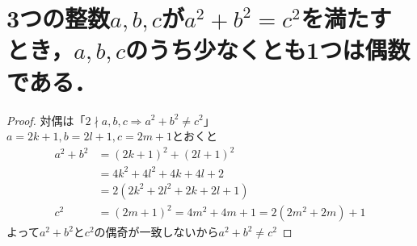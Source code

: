 \documentclass[a4paper,12pt]{ltjsarticle}
\begin{document}
\section{3つの整数$a, b, c$が$a^2 + b^2 = c^2$を満たすとき，$a, b, c$のうち少なくとも1つは偶数である．}
\begin{proof}
    対偶は「$2 \nmid a,b,c \Rightarrow a^2 + b^2 \neq c^2$」 \\
    $a = 2k + 1, b = 2l + 1, c = 2m + 1$とおくと
    \begin{align*}
        a^2 + b^2 &= (2k + 1)^2 + (2l + 1)^2 \\
                  &= 4k^2 + 4l^2 + 4k + 4l + 2 \\
                  &= 2(2k^2 + 2l^2 + 2k + 2l + 1) \\
        c^2 &= (2m + 1)^2 = 4m^2 + 4m + 1 = 2(2m^2 + 2m) + 1
    \end{align*}
    よって$a^2 + b^2$と$c^2$の偶奇が一致しないから$a^2 + b^2 \neq c^2$
\end{proof}
\end{document}
